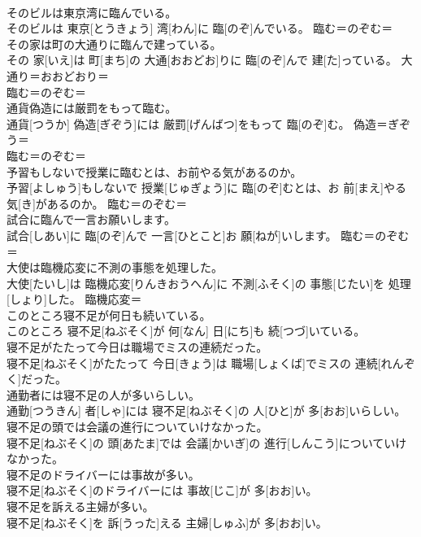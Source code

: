 \documentclass[8pt]{extreport}
\begin{document}
\begin{CJK}{UTF8}{min}
\\	そのビルは東京湾に臨んでいる。	
\\	そのビルは 東京[とうきょう] 湾[わん]に 臨[のぞ]んでいる。	臨む＝のぞむ＝ 
\\	その家は町の大通りに臨んで建っている。	
\\	その 家[いえ]は 町[まち]の 大通[おおどお]りに 臨[のぞ]んで 建[た]っている。	大通り＝おおどおり＝ 
\\	臨む＝のぞむ＝ 
\\	通貨偽造には厳罰をもって臨む。	
\\	通貨[つうか] 偽造[ぎぞう]には 厳罰[げんばつ]をもって 臨[のぞ]む。	偽造＝ぎぞう＝ 
\\	臨む＝のぞむ＝ 
\\	予習もしないで授業に臨むとは、お前やる気があるのか。	
\\	予習[よしゅう]もしないで 授業[じゅぎょう]に 臨[のぞ]むとは、お 前[まえ]やる 気[き]があるのか。	臨む＝のぞむ＝ 
\\	試合に臨んで一言お願いします。	
\\	試合[しあい]に 臨[のぞ]んで 一言[ひとこと]お 願[ねが]いします。	臨む＝のぞむ＝ 
\\	大使は臨機応変に不測の事態を処理した。	
\\	大使[たいし]は 臨機応変[りんきおうへん]に 不測[ふそく]の 事態[じたい]を 処理[しょり]した。	臨機応変＝ 
\\	このところ寝不足が何日も続いている。	
\\	このところ 寝不足[ねぶそく]が 何[なん] 日[にち]も 続[つづ]いている。	
\\	寝不足がたたって今日は職場でミスの連続だった。	
\\	寝不足[ねぶそく]がたたって 今日[きょう]は 職場[しょくば]でミスの 連続[れんぞく]だった。	
\\	通勤者には寝不足の人が多いらしい。	
\\	通勤[つうきん] 者[しゃ]には 寝不足[ねぶそく]の 人[ひと]が 多[おお]いらしい。	
\\	寝不足の頭では会議の進行についていけなかった。	
\\	寝不足[ねぶそく]の 頭[あたま]では 会議[かいぎ]の 進行[しんこう]についていけなかった。	
\\	寝不足のドライバーには事故が多い。	
\\	寝不足[ねぶそく]のドライバーには 事故[じこ]が 多[おお]い。	
\\	寝不足を訴える主婦が多い。	
\\	寝不足[ねぶそく]を 訴[うった]える 主婦[しゅふ]が 多[おお]い。	

\end{CJK}
\end{document}

